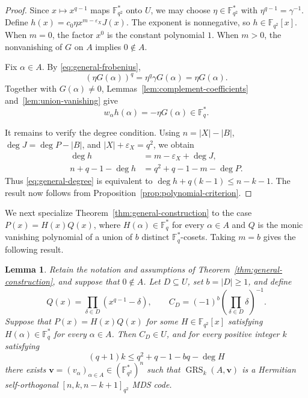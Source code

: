 \documentclass[preprint,12pt,a4paper]{elsarticle}
\newtheorem{lemma}[theorem]{Lemma}
\newcommand{\GRS}{\operatorname{GRS}}
\begin{document}
\begin{proof}
Since $x\mapsto x^{q-1}$ maps $\mathbb F_{q^2}^{*}$ onto $U$, we may choose $\eta\in\mathbb F_{q^2}^{*}$ with $\eta^{q-1}=\gamma^{-1}$. Define $h(x)=c_0\eta x^{m-\varepsilon_X}J(x)$. The exponent is nonnegative, so $h\in\mathbb F_{q^2}[x]$. When $m=0$, the factor $x^0$ is the constant polynomial $1$. When $m>0$, the nonvanishing of $G$ on $A$ implies $0\notin A$.

Fix $\alpha\in A$. By \eqref{eq:general-frobenius},
\[
 (\eta G(\alpha))^q=\eta^q\gamma G(\alpha)=\eta G(\alpha).
\]
Together with $G(\alpha)\ne0$, Lemmas~\ref{lem:complement-coefficients} and~\ref{lem:union-vanishing} give
\[
 w_\alpha h(\alpha)=-\eta G(\alpha)\in\mathbb F_q^{*}.
\]

It remains to verify the degree condition. Using $n=|X|-|B|$, $\deg J=\deg P-|B|$, and $|X|+\varepsilon_X=q^2$, we obtain
\[
\begin{aligned}
 \deg h&=m-\varepsilon_X+\deg J,\\
 n+q-1-\deg h&=q^2+q-1-m-\deg P.
\end{aligned}
\]
Thus \eqref{eq:general-degree} is equivalent to $\deg h+q(k-1)\le n-k-1$. The result now follows from Proposition~\ref{prop:polynomial-criterion}.
\end{proof}


We next specialize Theorem~\ref{thm:general-construction} to the case $P(x)=H(x)Q(x)$, where $H(\alpha)\in\mathbb F_q^{*}$ for every $\alpha\in A$ and $Q$ is the monic vanishing polynomial of a union of $b$ distinct $\mathbb F_q^{*}$-cosets. Taking $m=b$ gives the following result.

\begin{lemma}\label{lem:q-power-calculation}
Retain the notation and assumptions of Theorem~\ref{thm:general-construction}, and suppose that $0\notin A$. Let $D\subseteq U$, set $b=|D|\ge1$, and define
\[
 Q(x)=\prod_{\delta\in D}(x^{q-1}-\delta),
 \qquad C_D=(-1)^b\left(\prod_{\delta\in D}\delta\right)^{-1}.
\]
Suppose that $P(x)=H(x)Q(x)$ for some $H\in\mathbb F_{q^2}[x]$ satisfying $H(\alpha)\in\mathbb F_q^{*}$ for every $\alpha\in A$.
Then $C_D\in U$, and for every positive integer $k$ satisfying
\begin{equation}\label{eq:specialized-degree}
 (q+1)k\le q^2+q-1-bq-\deg H
\end{equation}
there exists $\boldsymbol v=(v_\alpha)_{\alpha\in A}\in(\mathbb F_{q^2}^{*})^n$ such that $\GRS_k(A,\boldsymbol v)$ is a Hermitian self-orthogonal \mbox{$[n,k,n-k+1]_{q^2}$} MDS code.
\end{lemma}
\end{document}
